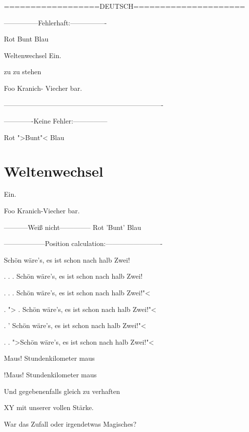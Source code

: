 
==================DEUTSCH=====================

---------------Fehlerhaft:----------------



Rot Bunt Blau


Weltenwechsel Ein.


zu zu stehen


Foo Kranich- Viecher bar. 

----------------------------------------------------------------------

-------------Keine Fehler:---------------



Rot ">Bunt"< Blau





\chapter{Weltenwechsel}
Ein.





Foo Kranich-Viecher bar. 



-----------Weiß nicht--------------
Rot 'Bunt' Blau




------------------Position calculation:-------------------------

Schön wäre's, es ist schon nach halb Zwei!

. . . Schön wäre's, es ist schon nach halb Zwei! 

. . . Schön wäre's, es ist schon nach halb Zwei!"< 

. "> . Schön wäre's, es ist schon nach halb Zwei!"< 

. ' Schön wäre's, es ist schon nach halb Zwei!"< 

. . ">Schön wäre's, es ist schon nach halb Zwei!"< 


Maus! Stundenkilometer maus


!Maus! Stundenkilometer maus

Und gegebenenfalls gleich zu verhaften

XY mit unserer vollen Stärke.

War das Zufall oder irgendetwas Magisches?